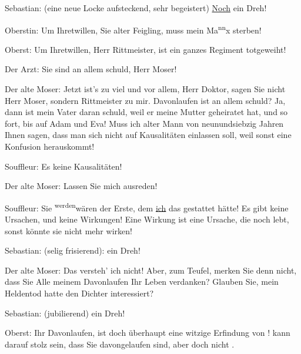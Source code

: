 \pstart
           Sebastian: (eine neue Locke aufsteckend, sehr begeistert) \uline{Noch} ein Dreh!\pend
           
\pstart
           Oberstin: Um Ihretwillen, Sie alter Feigling, muss mein Ma\substVorne{}\textsuperscript{nn}\substDazwischen{}x\substHinten{} sterben!\pend
           
\pstart
           Oberst: Um Ihretwillen, Herr Rittmeister, ist ein ganzes Regiment totgeweiht!\pend
           
\pstart
           Der Arzt: Sie sind an allem schuld, Herr Moser!\pend
           
\pstart
           Der alte Moser: Jetzt ist’s zu viel und vor allem, Herr Doktor, sagen Sie nicht Herr
               Moser, sondern Rittmeister zu mir.  Davonlaufen ist an
               allem schuld? Ja, {\pb}dann ist mein
               Vater daran schuld, weil er meine Mutter geheiratet hat, und so fort, bis auf Adam
               und Eva! Muss ich alter Mann von neunundsiebzig Jahren Ihnen sagen, dass man sich
               nicht auf Kausalitäten einlassen soll, weil sonst eine Konfusion herauskommt!\pend
           
\pstart
           Souffleur: Es  keine Kausalitäten!\pend
           
\pstart
           Der alte Moser: Lassen Sie mich ausreden!\pend
           
\pstart
           Souffleur: Sie \substVorne{}\textsuperscript{werden}\substDazwischen{}wären\substHinten{} der Erste, dem \uline{ich} das gestattet hätte! Es
               gibt keine Ursachen, und keine Wirkungen! Eine Wirkung ist eine Ursache, die noch
               lebt, sonst könnte sie nicht mehr wirken!\pend
           
\pstart
           Sebastian: (selig frisierend):  ein Dreh!\pend
           
\pstart
           Der alte Moser: Das versteh’ ich nicht! Aber, zum Teufel, merken Sie denn nicht, dass
               Sie Alle meinem Davonlaufen Ihr Leben verdanken? Glauben Sie, mein Heldentod hatte
               den Dichter interessiert?\pend
           
\pstart
           Sebastian: (jubilierend)  ein Dreh!\pend
           
\pstart
           Oberst: Ihr Davonlaufen, ist doch überhaupt eine witzige Erfindung von !  kann darauf stolz sein,
               dass Sie davongelaufen sind, aber doch nicht .\pend
           
